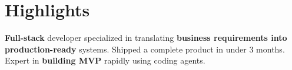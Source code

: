 \section{Highlights}

\begin{onecolentry}
    \begin{highlightsforbulletentries}

    \item \textbf{Full-stack} developer specialized in translating \textbf{business requirements into production-ready} systems. Shipped a complete product in under 3 months. Expert in \textbf{building MVP} rapidly using coding agents.


    \end{highlightsforbulletentries}
\end{onecolentry}